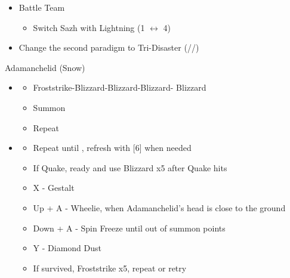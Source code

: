 \begin{multicols}{2}
\begin{menu}
\begin{itemize}
\begin{itemize}
\begin{itemize}
              \item Battle Team
                    \begin{itemize}
                      \item Switch Sazh with Lightning (1 $\leftrightarrow$ 4)
                    \end{itemize}
              \item Change the second paradigm to Tri-Disaster (\rav/\rav/\rav)
            \end{itemize}
          \end{itemize}
  \end{itemize}
\end{menu}

\begin{battle}[0:54]{Adamanchelid (Snow)}
  \begin{itemize}
    \item \sixth
          \begin{itemize}
            \item Froststrike-Blizzard-Blizzard-Blizzard- Blizzard
            \item Summon
            \item Repeat
          \end{itemize}
    \item \fifth
          \begin{itemize}
            \item Repeat until \stagger, refresh with [6] when needed
            \item If Quake, ready and use Blizzard x5 after Quake hits
            \item X - Gestalt
            \item Up + A - Wheelie, when Adamanchelid's head is close to the ground
            \item Down + A - Spin Freeze until out of summon points
            \item Y - Diamond Dust
            \item If survived, Froststrike x5, repeat or retry
          \end{itemize}
  \end{itemize}
\end{battle}


\end{multicols}
